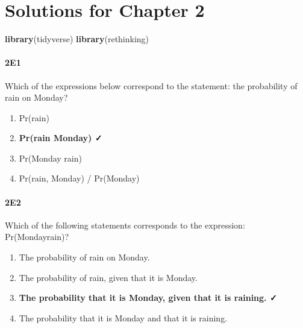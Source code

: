 \documentclass[
]{book}
\newenvironment{Shaded}{\begin{snugshade}}{\end{snugshade}}
\newcommand{\KeywordTok}[1]{\textcolor[rgb]{0.13,0.29,0.53}{\textbf{#1}}}
\newcommand{\NormalTok}[1]{#1}
\providecommand{\tightlist}{%
  \setlength{\itemsep}{0pt}\setlength{\parskip}{0pt}}
\begin{document}
\hypertarget{solutions-for-chapter-2}{%
\chapter{Solutions for Chapter 2}\label{solutions-for-chapter-2}}

\begin{Shaded}
\begin{Highlighting}[]
\KeywordTok{library}\NormalTok{(tidyverse)}
\KeywordTok{library}\NormalTok{(rethinking)}
\end{Highlighting}
\end{Shaded}

\hypertarget{e1}{%
\subsubsection*{2E1}\label{e1}}

Which of the expressions below correspond to the statement: the probability of rain on Monday?

\begin{enumerate}
\def\labelenumi{\arabic{enumi}.}
\tightlist
\item
  Pr(rain)
\item
  \textbf{Pr(rain \textbar{} Monday) ✓}
\item
  Pr(Monday \textbar{} rain)
\item
  Pr(rain, Monday) / Pr(Monday)
\end{enumerate}

\hypertarget{e2}{%
\subsubsection*{2E2}\label{e2}}

Which of the following statements corresponds to the expression: Pr(Monday\textbar rain)?

\begin{enumerate}
\def\labelenumi{\arabic{enumi}.}
\tightlist
\item
  The probability of rain on Monday.
\item
  The probability of rain, given that it is Monday.
\item
  \textbf{The probability that it is Monday, given that it is raining. ✓}
\item
  The probability that it is Monday and that it is raining.
\end{enumerate}
\end{document}
